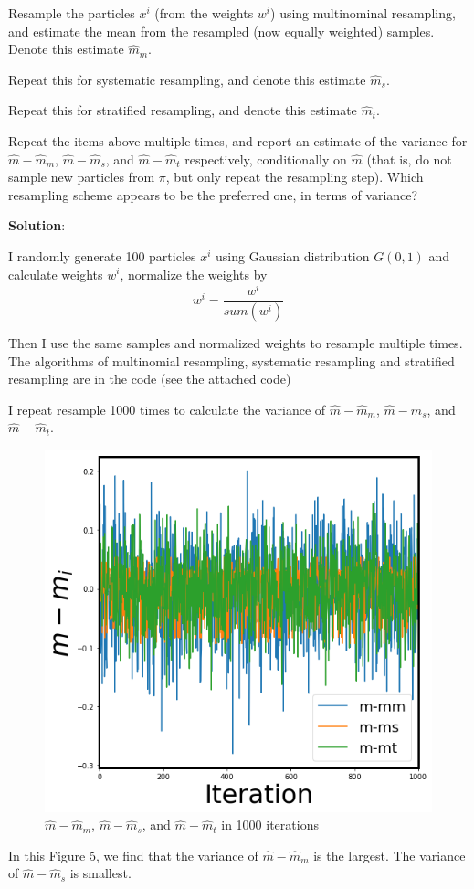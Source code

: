 \documentclass{article}
\begin{document}
Resample the particles $x^i$ (from the weights $w^i$) using multinominal resampling, and estimate the mean from the resampled (now equally weighted) samples. Denote this estimate $\hat{m}_m$.

Repeat this for systematic resampling, and denote this estimate $\hat{m}_s$.

Repeat this for stratified resampling, and denote this estimate $\hat{m}_t$.

Repeat the items above multiple times, and report an estimate of the variance for $\hat{m}-\hat{m}_m$, $\hat{m}-\hat{m}_s$, and $\hat{m}-\hat{m}_t$ respectively, conditionally on $\hat{m}$ (that is, do not sample new particles from $\pi$, but only repeat the resampling step). Which resampling scheme appears to be the preferred one, in terms of variance?

\textbf{Solution}:

I randomly generate 100 particles $x^{i}$ using Gaussian distribution $G(0,1)$ and calculate weights $w^{i}$, normalize the weights by 
\begin{equation}
    w^{i} = \frac{w^{i}}{sum(w^{i})}
\end{equation}

Then I use the same samples and normalized weights to resample multiple times. 
The algorithms of multinomial resampling, systematic resampling and stratified resampling are in the code (see the attached code)

I repeat resample 1000 times to calculate the variance of $\hat{m}-\hat{m}_m$, $\hat{m}-\hat{m}_s$, and $\hat{m}-\hat{m}_t$.

\begin{figure}[h!]
\centering
\includegraphics[scale=0.4]{fig/P5_1.png}
\caption{$\hat{m}-\hat{m}_m$, $\hat{m}-\hat{m}_s$, and $\hat{m}-\hat{m}_t$ in 1000 iterations}
\end{figure}
In this Figure 5, we find that the variance of $\hat{m}-\hat{m}_m$ is the largest. The variance of $\hat{m}-\hat{m}_s$ is smallest. 
\end{document}
